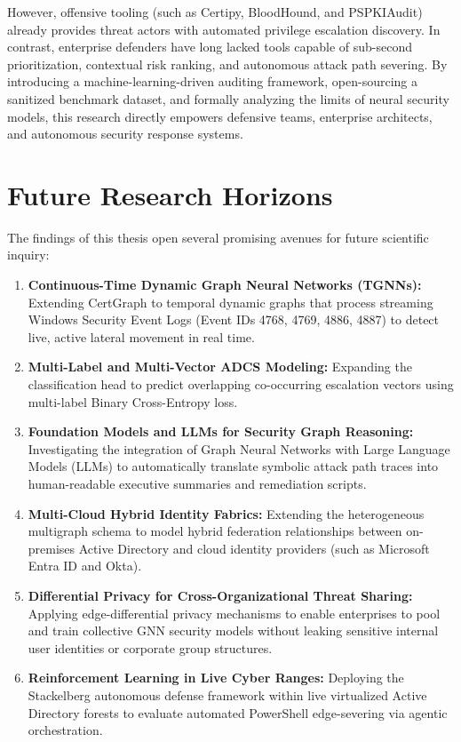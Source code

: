 However, offensive tooling (such as Certipy, BloodHound, and PSPKIAudit) already provides threat actors with automated privilege escalation discovery. In contrast, enterprise defenders have long lacked tools capable of sub-second prioritization, contextual risk ranking, and autonomous attack path severing. By introducing a machine-learning-driven auditing framework, open-sourcing a sanitized benchmark dataset, and formally analyzing the limits of neural security models, this research directly empowers defensive teams, enterprise architects, and autonomous security response systems.

\section{Future Research Horizons}
\label{sec:future_work}
The findings of this thesis open several promising avenues for future scientific inquiry:

\begin{enumerate}
    \item \textbf{Continuous-Time Dynamic Graph Neural Networks (TGNNs):} Extending CertGraph to temporal dynamic graphs that process streaming Windows Security Event Logs (Event IDs 4768, 4769, 4886, 4887) to detect live, active lateral movement in real time.
    \item \textbf{Multi-Label and Multi-Vector ADCS Modeling:} Expanding the classification head to predict overlapping co-occurring escalation vectors using multi-label Binary Cross-Entropy loss.
    \item \textbf{Foundation Models and LLMs for Security Graph Reasoning:} Investigating the integration of Graph Neural Networks with Large Language Models (LLMs) to automatically translate symbolic attack path traces into human-readable executive summaries and remediation scripts.
    \item \textbf{Multi-Cloud Hybrid Identity Fabrics:} Extending the heterogeneous multigraph schema to model hybrid federation relationships between on-premises Active Directory and cloud identity providers (such as Microsoft Entra ID and Okta).
    \item \textbf{Differential Privacy for Cross-Organizational Threat Sharing:} Applying edge-differential privacy mechanisms to enable enterprises to pool and train collective GNN security models without leaking sensitive internal user identities or corporate group structures.
    \item \textbf{Reinforcement Learning in Live Cyber Ranges:} Deploying the Stackelberg autonomous defense framework within live virtualized Active Directory forests to evaluate automated PowerShell edge-severing via agentic orchestration.
\end{enumerate}


